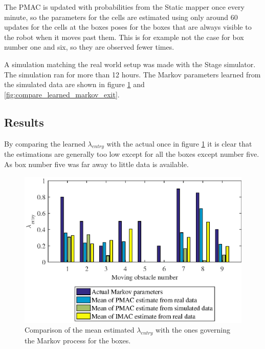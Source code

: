 The PMAC is updated with probabilities from the Static mapper once every minute, so the parameters for the cells are estimated using only around $60$ updates for the cells at the boxes poses for the boxes that are always visible to the robot when it moves past them.
This is for example not the case for box number one and six, so they are observed fewer times.

A simulation matching the real world setup was made with the Stage simulator. 
The simulation ran for more than 12 hours. 
The Markov parameters learned from the simulated data are shown in figure \ref{fig:compare_learned_markov_entry} and \ref{fig:compare_learned_markov_exit}.


\subsection{Results}
By comparing the learned $\lambda_{entry}$ with the actual once in figure \ref{fig:compare_learned_markov_entry} it is clear that the estimations are generally too low except for all the boxes except number five.
As box number five was far away to little data is available.

\begin{figure}
    \centering
    \includegraphics[scale=1]{chapters/evaluation/figures/compare_learned_markov_entry}
    \caption{Comparison of the mean estimated $\lambda_{entry}$ with the ones governing the Markov process for the boxes.}
    \label{fig:compare_learned_markov_entry}
\end{figure}

